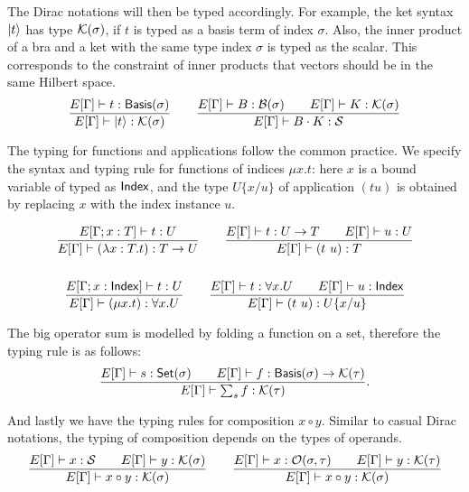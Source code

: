 \documentclass[runningheads]{llncs}
\begin{document}
The Dirac notations will then be typed accordingly. For example, the ket syntax $\ket{t}$ has type $\mathcal{K}(\sigma)$, if $t$ is typed as a basis term of index $\sigma$. Also, the inner product of a bra and a ket with the same type index $\sigma$ is typed as the scalar. This corresponds to the constraint of inner products that vectors should be in the same Hilbert space.
\begin{gather*}
    \frac{E[\Gamma]\vdash t : \mathsf{Basis}(\sigma)}{E[\Gamma] \vdash \ket{t} : \mathcal{K}(\sigma)}
    \qquad
    \frac{E[\Gamma]\vdash B : \mathcal{B}(\sigma) \qquad E[\Gamma]\vdash K : \mathcal{K}(\sigma)}{E[\Gamma] \vdash B \cdot K : \mathcal{S}}
\end{gather*}

The typing for functions and applications follow the common practice. We specify the syntax and typing rule for functions of indices $\mu x. t$: here $x$ is a bound variable of typed as $\mathsf{Index}$, and the type $U\{x/u\}$ of application $(t u)$ is obtained by replacing $x$ with the index instance $u$.


\begin{gather*}
    \frac{E[\Gamma; x : T] \vdash t : U}{E[\Gamma] \vdash (\lambda x : T . t) : T \to U}
    \qquad
    \frac{E[\Gamma] \vdash t:U \to T \qquad E[\Gamma] \vdash u:U}{E[\Gamma] \vdash (t\ u):T} \\
    \\
    \frac{E[\Gamma; x : \mathsf{Index}] \vdash t : U}{E[\Gamma] \vdash (\mu x.t) : \forall x.U}
    \qquad
    \frac{E[\Gamma] \vdash t:\forall x.U \qquad E[\Gamma] \vdash u : \mathsf{Index}}{E[\Gamma] \vdash (t\ u):U\{x/u\}}
\end{gather*}


The big operator sum is modelled by folding a function on a set, therefore the typing rule is as follows:
\[
    \frac{E[\Gamma] \vdash s : \mathsf{Set}(\sigma) \qquad E[\Gamma] \vdash f : \mathsf{Basis}(\sigma) \to \mathcal{K}(\tau)}{E[\Gamma] \vdash \sum_{s} f : \mathcal{K}(\tau)}.
\]

And lastly we have the typing rules for composition $x \circ y$. Similar to casual Dirac notations, the typing of composition depends on the types of operands.
\begin{gather*}
    \frac{E[\Gamma] \vdash x : \mathcal{S} \qquad E[\Gamma] \vdash y : \mathcal{K}(\sigma)}{E[\Gamma] \vdash x \circ y : \mathcal{K}(\sigma)}
    \qquad
    \frac{E[\Gamma] \vdash x : \mathcal{O}(\sigma, \tau) \qquad E[\Gamma] \vdash y : \mathcal{K}(\tau)}{E[\Gamma] \vdash x \circ y : \mathcal{K}(\sigma)}
\end{gather*}
\end{document}
